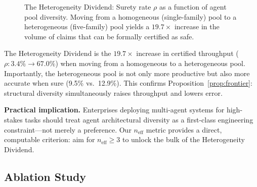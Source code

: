 \documentclass[conference]{IEEEtran}
\begin{document}
\begin{figure}[t]
  \centering
  \caption{The Heterogeneity Dividend: Surety rate $\rho$ as a function of agent pool diversity. Moving from a homogeneous (single-family) pool to a heterogeneous (five-family) pool yields a $19.7\times$ increase in the volume of claims that can be formally certified as safe.}
  \label{fig:dividend}
\end{figure}

The Heterogeneity Dividend is the $19.7\times$ increase in
certified throughput ($\rho: 3.4\% \to 67.0\%$) when moving
from a homogeneous to a heterogeneous pool.
Importantly, the heterogeneous pool is not only more productive
but also more accurate when sure (9.5\% vs.\ 12.9\%).
This confirms Proposition~\ref{prop:frontier}: structural
diversity simultaneously raises throughput and lowers error.

\textbf{Practical implication.}
Enterprises deploying multi-agent systems for high-stakes
tasks should treat agent architectural diversity as a
first-class engineering constraint---not merely a preference.
Our $n_\text{eff}$ metric provides a direct, computable
criterion: aim for $n_\text{eff} \geq 3$ to unlock the bulk
of the Heterogeneity Dividend.

\subsection{Ablation Study}
\end{document}
